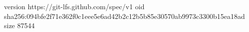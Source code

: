 version https://git-lfs.github.com/spec/v1
oid sha256:094bfe2f71e362f0c1eee5e6ad42b2c12b5b85e30570ab9973c3300b15ea18ad
size 87544
